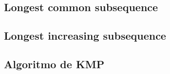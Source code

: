 \documentclass[10pt,letterpaper,twocolumn]{article}
\begin{document}
	\subsection{Longest common subsequence}
	
	\subsection{Longest increasing subsequence}
	
	\subsection{Algoritmo de KMP}
	
	

% 
% 
% 
% 
% 
% 
\end{document}
